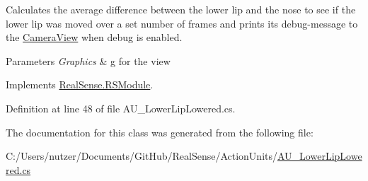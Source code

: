 Calculates the average difference between the lower lip and the nose to see if the lower lip was moved over a set number of frames and prints its\textquotesingle{} debug-\/message to the \hyperlink{class_real_sense_1_1_camera_view}{Camera\+View} when debug is enabled. 
\begin{DoxyParams}{Parameters}
{\em Graphics} & g for the view \\
\hline
\end{DoxyParams}


Implements \hyperlink{class_real_sense_1_1_r_s_module_a2ec830b7932ee7c0077d473f81c73867}{Real\+Sense.\+R\+S\+Module}.



Definition at line 48 of file A\+U\+\_\+\+Lower\+Lip\+Lowered.\+cs.



The documentation for this class was generated from the following file\+:\begin{DoxyCompactItemize}
\item 
C\+:/\+Users/nutzer/\+Documents/\+Git\+Hub/\+Real\+Sense/\+Action\+Units/\hyperlink{_a_u___lower_lip_lowered_8cs}{A\+U\+\_\+\+Lower\+Lip\+Lowered.\+cs}\end{DoxyCompactItemize}
